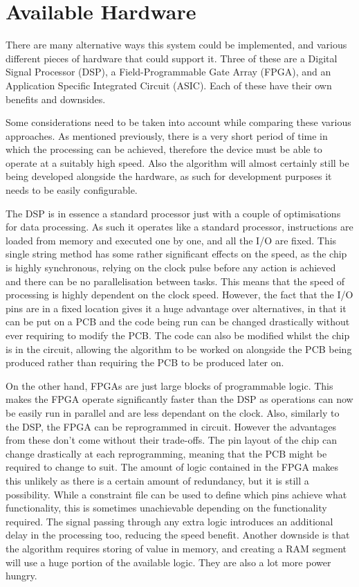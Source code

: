 \section{Available Hardware}
There are many alternative ways this system could be implemented, and various different pieces of hardware that could support it.
Three of these are a Digital Signal Processor (DSP), a Field-Programmable Gate Array (FPGA), and an Application Specific Integrated Circuit (ASIC).
Each of these have their own benefits and downsides.

Some considerations need to be taken into account while comparing these various approaches.
As mentioned previously, there is a very short period of time in which the processing can be achieved, therefore the device must be able to operate at a suitably high speed.
Also the algorithm will almost certainly still be being developed alongside the hardware, as such for development purposes it needs to be easily configurable.

The DSP is in essence a standard processor just with a couple of optimisations for data processing. 
As such it operates like a standard processor, instructions are loaded from memory and executed one by one, and all the I/O are fixed.
This single string method has some rather significant effects on the speed, as the chip is highly synchronous, relying on the clock pulse before any action is achieved and there can be no parallelisation between tasks.
This means that the speed of processing is highly dependent on the clock speed.
However, the fact that the I/O pins are in a fixed location gives it a huge advantage over alternatives, in that it can be put on a PCB and the code being run can be changed drastically without ever requiring to modify the PCB.
The code can also be modified whilst the chip is in the circuit, allowing the algorithm to be worked on alongside the PCB being produced rather than requiring the PCB to be produced later on.

On the other hand, FPGAs are just large blocks of programmable logic.
This makes the FPGA operate significantly faster than the DSP as operations can now be easily run in parallel and are less dependant on the clock.
Also, similarly to the DSP, the FPGA can be reprogrammed in circuit.
However the advantages from these don't come without their trade-offs.
The pin layout of the chip can change drastically at each reprogramming, meaning that the PCB might be required to change to suit.
The amount of logic contained in the FPGA makes this unlikely as there is a certain amount of redundancy, but it is still a possibility.
While a constraint file can be used to define which pins achieve what functionality, this is sometimes unachievable depending on the functionality required.
The signal passing through any extra logic introduces an additional delay in the processing too, reducing the speed benefit.
Another downside is that the algorithm requires storing of value in memory, and creating a RAM segment will use a huge portion of the available logic.
They are also a lot more power hungry.

